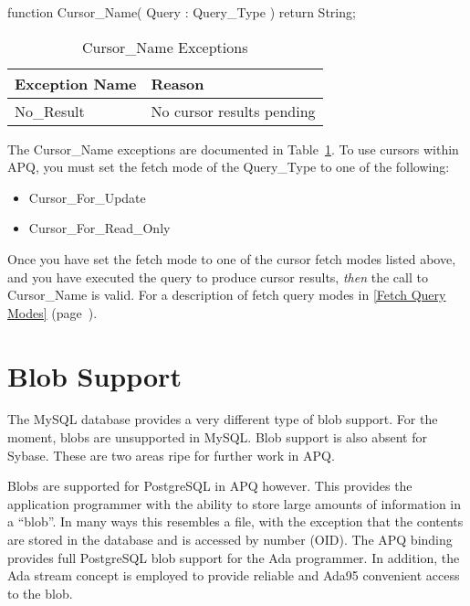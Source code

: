 \documentclass[english,letterpaper]{book}
\newcommand\Ref[1]{\textsection\ref{#1} (page~\pageref{#1})}
\begin{document}
\begin{Code}
function Cursor_Name(
   Query : Query_Type
) return String;
\end{Code}

\begin{table}
   \begin{center}
      \begin{tabular}{ll}
         Exception Name    &  Reason\\
         \hline 
         No\_Result        &  No cursor results pending\\
      \end{tabular}
   \end{center}
   \caption{Cursor\_Name Exceptions}\label{t:cnamx}
\end{table}

The Cursor\_Name exceptions are documented in Table~\ref{t:cnamx}.
To use cursors within APQ, you must set the fetch mode of the Query\_Type
to one of the following:

\begin{itemize}
   \item Cursor\_For\_Update
   \item Cursor\_For\_Read\_Only
\end{itemize}

Once you have set the fetch mode to one of the cursor fetch modes
listed above, and you have executed the query to produce cursor results,
\emph{then} the call to Cursor\_Name is valid. For a description of
fetch query modes in \Ref{Fetch Query Modes}.


\chapter{Blob Support}

The MySQL database provides a very different type of blob support.
For the moment, blobs are unsupported in MySQL. Blob support is also
absent for Sybase. These are two areas ripe for further work in APQ.

Blobs are supported for PostgreSQL in APQ however. This provides the
application programmer with the ability to store large amounts of
information in a ``blob''. In many ways this resembles
a file, with the exception that the contents are stored
in the database and is accessed by number (OID). The APQ
binding provides full PostgreSQL blob support for the Ada programmer.
In addition, the Ada stream concept is employed to
provide reliable and Ada95 convenient access to the blob.
\end{document}
